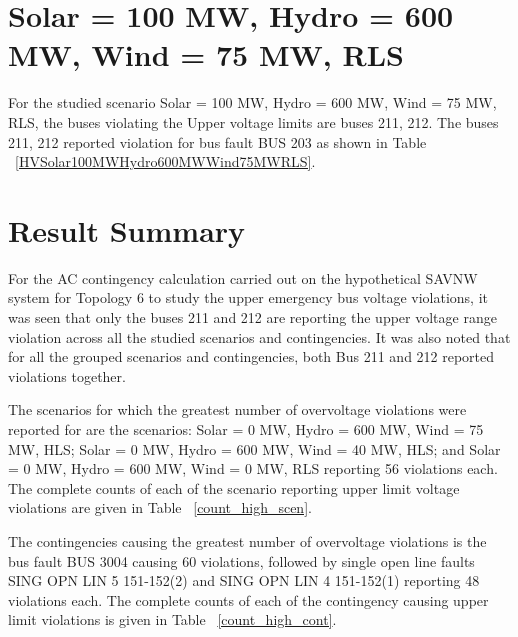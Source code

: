 \documentclass[10pt]{report}
\begin{document}
\section{Solar = 100 MW, Hydro = 600 MW, Wind = 75 MW, RLS}
For the studied scenario Solar = 100 MW, Hydro = 600 MW, Wind = 75 MW, RLS, the buses violating the Upper voltage limits are buses 211, 212.
The buses 211, 212 reported violation for bus fault BUS 203 as shown in Table ~\ref{HVSolar100MWHydro600MWWind75MWRLS}.
\begin{table}[H]
\caption{Contingencies reporting bus voltages greater than emergency voltage of 1.1 PU for scenario Solar = 100 MW, Hydro = 600 MW, Wind = 75 MW, RLS}
\label{HVSolar100MWHydro600MWWind75MWRLS}
\centering
{}
\end{table}




\section{Result Summary}
For the AC contingency calculation carried out on the hypothetical SAVNW system for Topology 6 to study the upper emergency bus voltage violations, it was seen that only the buses 211 and 212 are reporting the upper voltage range violation across all the studied scenarios and contingencies. It was also noted that for all the grouped scenarios and contingencies, both Bus 211 and 212 reported violations together. 

The scenarios for which the greatest number of overvoltage violations were reported for are the scenarios: Solar = 0 MW, Hydro = 600 MW, Wind = 75 MW, HLS; Solar = 0 MW, Hydro = 600 MW, Wind = 40 MW, HLS; and Solar = 0 MW, Hydro = 600 MW, Wind = 0 MW, RLS reporting 56 violations each. The complete counts of each of the scenario reporting upper limit voltage violations are given in Table ~\ref{count_high_scen}. 

The contingencies causing the greatest number of overvoltage violations is the bus fault BUS 3004 causing 60 violations, followed by single open line faults SING OPN LIN 5 151-152(2) and SING OPN LIN 4 151-152(1) reporting 48 violations each. The complete counts of each of the contingency causing upper limit violations is given in Table ~\ref{count_high_cont}.
\end{document}

